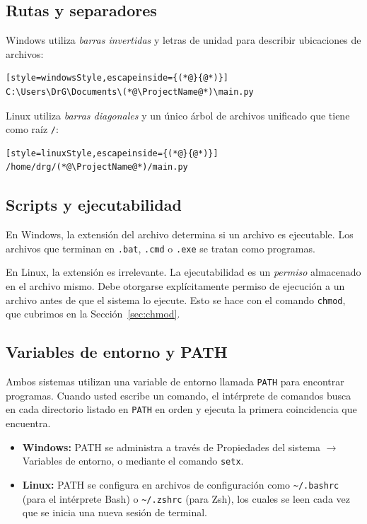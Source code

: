 \subsection{Rutas y separadores}

Windows utiliza \emph{barras invertidas} y letras de unidad para describir
ubicaciones de archivos:
\begin{lstlisting}[style=windowsStyle,escapeinside={(*@}{@*)}]
C:\Users\DrG\Documents\(*@\ProjectName@*)\main.py
\end{lstlisting}

Linux utiliza \emph{barras diagonales} y un único árbol de archivos
unificado que tiene como raíz \texttt{/}:
\begin{lstlisting}[style=linuxStyle,escapeinside={(*@}{@*)}]
/home/drg/(*@\ProjectName@*)/main.py
\end{lstlisting}

\subsection{Scripts y ejecutabilidad}

En Windows, la extensión del archivo determina si un archivo es ejecutable.
Los archivos que terminan en \texttt{.bat}, \texttt{.cmd} o \texttt{.exe}
se tratan como programas.

En Linux, la extensión es irrelevante. La ejecutabilidad es un
\emph{permiso} almacenado en el archivo mismo. Debe otorgarse
explícitamente permiso de ejecución a un archivo antes de que el sistema
lo ejecute. Esto se hace con el comando \texttt{chmod}, que cubrimos en
la Sección~\ref{sec:chmod}.

\subsection{Variables de entorno y PATH}

Ambos sistemas utilizan una variable de entorno llamada \texttt{PATH} para
encontrar programas. Cuando usted escribe un comando, el intérprete de
comandos busca en cada directorio listado en \texttt{PATH} en orden y
ejecuta la primera coincidencia que encuentra.

\begin{itemize}
  \item \textbf{Windows:} PATH se administra a través de Propiedades del
        sistema $\to$ Variables de entorno, o mediante el comando
        \texttt{setx}.
  \item \textbf{Linux:} PATH se configura en archivos de configuración como
        \texttt{\textasciitilde/.bashrc} (para el intérprete Bash) o
        \texttt{\textasciitilde/.zshrc} (para Zsh), los cuales se leen cada
        vez que se inicia una nueva sesión de terminal.
\end{itemize}


